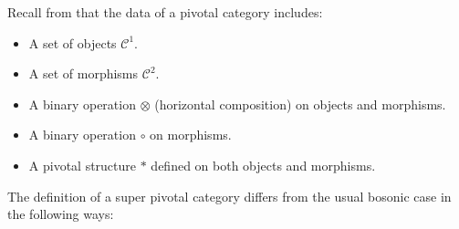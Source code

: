 \documentclass[12pt,a4paper]{article}
\newcommand{\tp}{\otimes}
\newcommand{\mcc}{\mathcal{C}}
\newcommand{\dave}[1]{{\color{ao(english)}\footnotesize{(DA) #1}}}
\newcommand{\ethan}[1]{{\color{amethyst}\footnotesize{(EL) #1}}}
\newcommand{\kw}[1]{{\color{kwcolor}\footnotesize{(KW) #1}}}
\begin{document}
Recall from 
\cite{kitaev2006}
that the data of a pivotal category includes:
\begin{itemize}
\item A set of objects $\mcc^1$.
\item A set of morphisms $\mcc^2$.
\item A binary operation $\otimes$ (horizontal composition) on objects and morphisms.
\item A binary operation $\circ$ on morphisms.
\item A pivotal structure $*$ defined on both objects and morphisms.
\end{itemize}


The definition of a super pivotal category differs from the usual bosonic case in the following ways:
\end{document}
